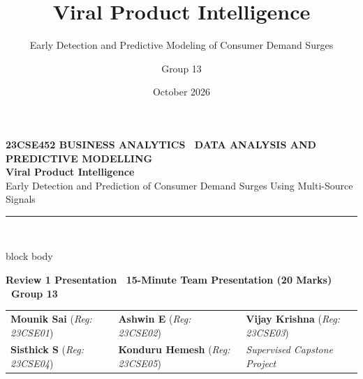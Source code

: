 \documentclass[aspectratio=169, 10pt]{beamer}
\title{Viral Product Intelligence}
\subtitle{Early Detection and Predictive Modeling of Consumer Demand Surges}
\author{Group 13}
\institute{23CSE452 Business Analytics}
\date{October 2026}
\newenvironment{card}[1][]{%
    \begin{beamercolorbox}[rounded=true,shadow=false,wd=\linewidth,sep=4pt,#1]{block body}%
}{%
    \end{beamercolorbox}%
}
\begin{document}
\begin{frame}[plain]
    \vspace{0.4cm}
    \begin{center}
        {\fontsize{8.5pt}{10pt}\selectfont \textbf{\color{BlueAccent}23CSE452 BUSINESS ANALYTICS \textbullet\ DATA ANALYSIS AND PREDICTIVE MODELLING}}\\[0.2cm]
        {\fontsize{16pt}{19pt}\selectfont \textbf{\color{NavyPrimary}Viral Product Intelligence}}\\[0.12cm]
        {\fontsize{10.5pt}{12.5pt}\selectfont \color{DarkText}Early Detection and Prediction of Consumer Demand Surges Using Multi-Source Signals}\\[0.25cm]
        \textcolor{BlueAccent}{\rule{0.45\paperwidth}{1.2pt}}\\[0.3cm]

        \begin{card}
            \centering
            {\fontsize{8.5pt}{10.5pt}\selectfont \textbf{\color{NavyPrimary}Review 1 Presentation \textbullet\ 15-Minute Team Presentation (20 Marks) \textbullet\ Group 13}}\\[0.15cm]
            \small
            \begin{tabular}{p{4.2cm}p{4.2cm}p{4.2cm}}
                \textbf{Mounik Sai} (\textit{Reg: 23CSE01}) & \textbf{Ashwin E} (\textit{Reg: 23CSE02}) & \textbf{Vijay Krishna} (\textit{Reg: 23CSE03}) \\
                \textbf{Sisthick S} (\textit{Reg: 23CSE04}) & \textbf{Konduru Hemesh} (\textit{Reg: 23CSE05}) & \textit{Supervised Capstone Project}
            \end{tabular}
        \end{card}
    \end{center}
\end{frame}
\end{document}
